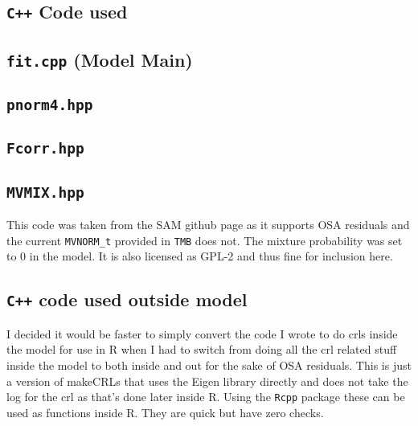\documentclass[11pt]{article}\usepackage[]{graphicx}\usepackage[]{color}
\begin{document}
\printbibliography

\begin{appendices}
  \section{\texttt{C++} Code used}\label{Ccode}
  \subsection{\texttt{fit.cpp} (Model Main)}
	
  
  \subsection{\texttt{pnorm4.hpp}}
  
  \subsection{\texttt{Fcorr.hpp}}
  
  \subsection{\texttt{MVMIX.hpp}}
  This code was taken from the SAM github page as it supports OSA residuals and the current \texttt{MVNORM\_t} provided in \texttt{TMB} does not. The mixture probability was set to 0 in the model. It is also licensed as GPL-2 and thus fine for inclusion here.
  
  \subsection{\texttt{C++} code used outside model}
  I decided it would be faster to simply convert the code I wrote to do \acrshort{crl}s inside the model for use in R when I had to switch from doing all the \acrshort{crl} related stuff inside the model to both inside and out for the sake of OSA residuals. This is just a version of makeCRLs that uses the Eigen library directly and does not take the log for the \acrshort{crl} as that's done later inside R. Using the \texttt{Rcpp} package these can be used as functions inside R. They are quick but have zero checks.
  

\end{appendices}
\end{document}
